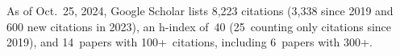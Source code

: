 %
As of Oct.~25, 2024, Google Scholar lists
8,223 citations (3,338 since 2019 and 600 new citations in 2023),
an h-index of~40 (25~counting only citations since 2019),
and 14~papers with 100+~citations, including 6~papers with 300+.
